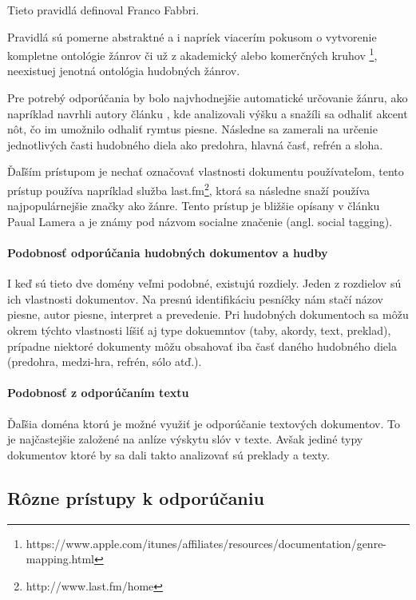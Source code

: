 Tieto pravidlá definoval Franco Fabbri\cite{music_genres_problematics}.

Pravidlá sú pomerne abstraktné a i napríek viacerím pokusom o vytvorenie
kompletne ontológie žánrov či už z akademický alebo komerčných kruhov
\footnote[2]{https://www.apple.com/itunes/affiliates/resources/documentation/genre-mapping.html},
neexistuej jenotná ontológia hudobných žánrov.

Pre potrebý odporúčania by bolo najvhodnejšie automatické určovanie žánru, ako napríklad 
navrhli autory článku \cite{automatic_genre_recognition}, kde analizovali výšku
a snažíli sa odhaliť akcent nôt, čo im umožnilo odhaliť rymtus piesne. Následne sa zamerali
na určenie jednotlivých časti hudobného diela ako predohra, hlavná časť, refrén a sloha.

Ďaľším prístupom je nechať označovať vlastnosti dokumentu používateľom, tento prístup
používa napríklad služba last.fm\footnote[3]{http://www.last.fm/home}, ktorá sa následne
snaží používa najpopulárnejšie značky ako žánre. Tento prístup je bližšie opísany v článku 
Paual Lamera\cite{social_tagging_music} a je známy pod názvom socialne značenie 
(angl. social tagging).

\paragraph{Podobnosť odporúčania hudobných dokumentov a hudby}

I keď sú tieto dve domény veľmi podobné, existujú rozdiely. Jeden z rozdielov sú ich vlastnosti 
dokumentov. Na presnú identifikáciu pesníčky nám stačí názov piesne, autor piesne, interpret a 
prevedenie. Pri hudobných dokumentoch sa môžu okrem týchto vlastnosti líšiť aj type dokuemntov
(taby, akordy, text, preklad), prípadne niektoré dokumenty môžu obsahovať iba časť daného
hudobného diela (predohra, medzi-hra, refrén, sólo atď.).

\paragraph{Podobnosť z odporúčaním textu}

Ďaľšia doména ktorú je možné využiť je odporúčanie textových dokumentov. To je najčastejšie 
založené na anlíze výskytu slóv v texte. Avšak jediné typy dokumentov ktoré by sa 
dali takto analizovať sú preklady a texty.

\subsection{Rôzne prístupy k odporúčaniu}

